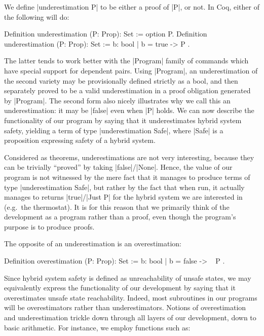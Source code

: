 \documentclass[runningheads]{llncs}
\begin{document}
We define |underestimation P| to be either a proof of
|P|, or not. In Coq, either of the following will do:
\begin{code}
Definition underestimation (P: Prop): Set := option P.
Definition underestimation (P: Prop): Set := { b: bool | b = true -> P }.
\end{code}
The latter tends to work better with the |Program| family of commands
\cite{sozeau} which have special support for dependent pairs. Using
|Program|, an underestimation of the second variety may be
provisionally defined strictly as a bool, and then separately proved
to be a valid underestimation in a proof obligation generated by
|Program|. The second form also nicely illustrates why we call this an
underestimation: it may be |false| even when |P| holds. We can now
describe the functionality of our program by saying that it
underestimates hybrid system safety, yielding a term of type
|underestimation Safe|, where |Safe| is a proposition expressing
safety of a hybrid system.

Considered as theorems, underestimations are not very interesting,
because they can be trivially ``proved'' by taking
|false|/|None|. Hence, the value of our program is not witnessed by
the mere fact that it manages to produce terms of type
|underestimation Safe|, but rather by the fact that when run, it
actually manages to returns |true|/|Just P| for the hybrid system we
are interested in (e.g.\ the thermostat). It is for this reason that
we primarily think of the development as a program rather than a
proof, even though the program's purpose is to produce proofs.

The opposite of an underestimation is an overestimation:
\begin{code}
Definition overestimation (P: Prop): Set := { b: bool | b = false -> ~ P }.
\end{code}

Since hybrid system safety is defined as unreachability of unsafe
states, we may equivalently express the functionality of our
development by saying that it overestimates unsafe state
reachability. Indeed, most subroutines in our programs will be
overestimators rather than underestimators. Notions of overestimation
and underestimation trickle down through all layers of our
development, down to basic arithmetic. For instance, we employ
functions such as:

\end{document}

